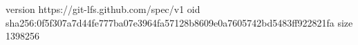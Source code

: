 version https://git-lfs.github.com/spec/v1
oid sha256:0f5f307a7d44fe777ba07e3964fa57128b8609e0a7605742bd5483ff922821fa
size 1398256
